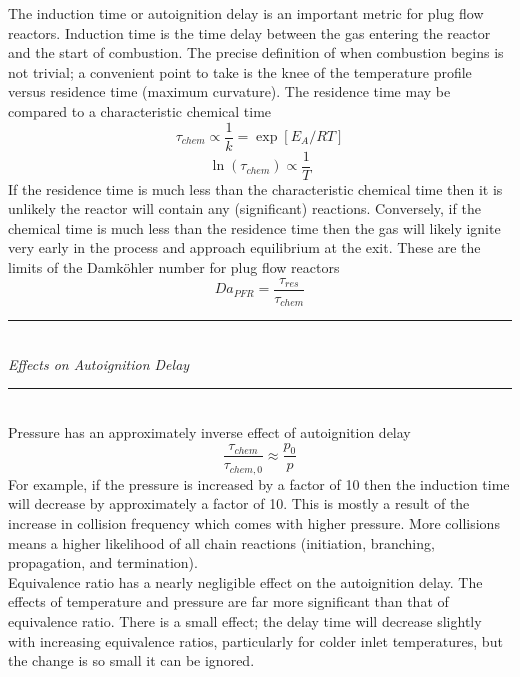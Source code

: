 \documentclass[11pt]{article}
\newcommand{\Header}[1]{\noindent\rule{\textwidth}{0.4pt}\\[0.3cm]\indent \large{\textit{#1}}\normalsize{}\\[-0.1cm]\noindent\rule{\textwidth}{0.4pt}}
\begin{document}
The induction time or autoignition delay is an important metric for plug flow reactors. Induction time is the time delay between the gas entering the reactor and the start of combustion. The precise definition of when combustion begins is not trivial; a convenient point to take is the knee of the temperature profile versus residence time (maximum curvature). The residence time may be compared to a characteristic chemical time
$$\tau_{chem} \propto \frac{1}{k} = \exp\left[E_A/RT\right]$$
$$\ln(\tau_{chem})\propto\frac{1}{T}$$
If the residence time is much less than the characteristic chemical time then it is unlikely the reactor will contain any (significant) reactions. Conversely, if the chemical time is much less than the residence time then the gas will likely ignite very early in the process and approach equilibrium at the exit. These are the limits of the Damk{\"o}hler number for plug flow reactors
$$Da_{PFR} = \frac{\tau_{res}}{\tau_{chem}}$$

\Header{Effects on Autoignition Delay}\\

Pressure has an approximately inverse effect of autoignition delay
$$\frac{\tau_{chem}}{\tau_{chem,0}} \approx \frac{p_0}{p}$$
For example, if the pressure is increased by a factor of 10 then the induction time will decrease by approximately a factor of 10. This is mostly a result of the increase in collision frequency which comes with higher pressure. More collisions means a higher likelihood of all chain reactions (initiation, branching, propagation, and termination).\\

Equivalence ratio has a nearly negligible effect on the autoignition delay. The effects of temperature and pressure are far more significant than that of equivalence ratio. There is a small effect; the delay time will decrease slightly with increasing equivalence ratios, particularly for colder inlet temperatures, but the change is so small it can be ignored.
\end{document}
